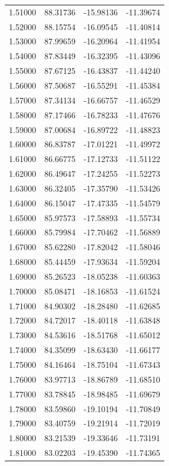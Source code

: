\begin{table}
\begin{tabular}{llll}
1.51000 & 88.31736 & -15.98136 & -11.39674 \\
1.52000 & 88.15754 & -16.09545 & -11.40814 \\
1.53000 & 87.99659 & -16.20964 & -11.41954 \\
1.54000 & 87.83449 & -16.32395 & -11.43096 \\
1.55000 & 87.67125 & -16.43837 & -11.44240 \\
1.56000 & 87.50687 & -16.55291 & -11.45384 \\
1.57000 & 87.34134 & -16.66757 & -11.46529 \\
1.58000 & 87.17466 & -16.78233 & -11.47676 \\
1.59000 & 87.00684 & -16.89722 & -11.48823 \\
1.60000 & 86.83787 & -17.01221 & -11.49972 \\
1.61000 & 86.66775 & -17.12733 & -11.51122 \\
1.62000 & 86.49647 & -17.24255 & -11.52273 \\
1.63000 & 86.32405 & -17.35790 & -11.53426 \\
1.64000 & 86.15047 & -17.47335 & -11.54579 \\
1.65000 & 85.97573 & -17.58893 & -11.55734 \\
1.66000 & 85.79984 & -17.70462 & -11.56889 \\
1.67000 & 85.62280 & -17.82042 & -11.58046 \\
1.68000 & 85.44459 & -17.93634 & -11.59204 \\
1.69000 & 85.26523 & -18.05238 & -11.60363 \\
1.70000 & 85.08471 & -18.16853 & -11.61524 \\
1.71000 & 84.90302 & -18.28480 & -11.62685 \\
1.72000 & 84.72017 & -18.40118 & -11.63848 \\
1.73000 & 84.53616 & -18.51768 & -11.65012 \\
1.74000 & 84.35099 & -18.63430 & -11.66177 \\
1.75000 & 84.16464 & -18.75104 & -11.67343 \\
1.76000 & 83.97713 & -18.86789 & -11.68510 \\
1.77000 & 83.78845 & -18.98485 & -11.69679 \\
1.78000 & 83.59860 & -19.10194 & -11.70849 \\
1.79000 & 83.40759 & -19.21914 & -11.72019 \\
1.80000 & 83.21539 & -19.33646 & -11.73191 \\
1.81000 & 83.02203 & -19.45390 & -11.74365 \\

\end{tabular}
\end{table}
